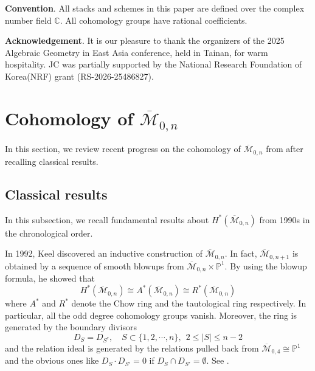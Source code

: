\documentclass[11pt,letterpaper]{amsart}
\numberwithin{equation}{section}
\theoremstyle{definition}
\newcommand{\PP}{\mathbb{P}}
\def\CC{\mathbb{C}}
\newcommand{\cal}{\mathcal}
\def\cM{{\cal M}}
\def\ocM{\overline{\cM}}
\def\mzn{\overline{\cM}_{0,n} }
\def\beq{\begin{equation}}
\def\eeq{\end{equation}}
\begin{document}
\medskip

\noindent\textbf{Convention}. All stacks and schemes in this paper are defined over the complex number field $\CC$. All cohomology groups have rational coefficients.

\medskip

\noindent \textbf{Acknowledgement}.
It is our pleasure to thank the organizers of the 2025 Algebraic Geometry in East Asia conference, held in Tainan, for warm hospitality. JC was partially supported by the National Research Foundation of Korea(NRF) grant (RS-2026-25486827).  %




\bigskip
\section{Cohomology of $\mzn$}\label{S2}
In this section, we review recent progress on the cohomology of $\mzn$ from \cite{CKL1, CKL2, CKL3} after recalling classical results.

\subsection{Classical results}
In this subsection, we recall fundamental results about $H^*(\mzn)$ from 1990s in the chronological order.

In 1992, Keel discovered an inductive construction of $\mzn$. In fact, $\ocM_{0,n+1}$ is obtained by a sequence of smooth blowups from $\mzn\times \PP^1$. By using the blowup formula, he showed that
$$H^*(\mzn)\cong A^*(\mzn)\cong R^*(\mzn)$$
where $A^*$ and $R^*$ denote the Chow ring and the tautological ring respectively. In particular, all the odd degree cohomology groups vanish. Moreover, the ring is generated by the boundary divisors
\beq\label{10}
D_S=D_{S^c},\quad S\subset \{1,2,\cdots,n\},\ \  2\le |S|\le n-2\eeq
and the relation ideal is generated by
the relations pulled back from $\ocM_{0,4}\cong \PP^1$ and the obvious ones like $D_S\cdot D_{S'}=0$ if $D_S\cap D_{S'}=\emptyset$. See \cite{Keel}.
\end{document}
